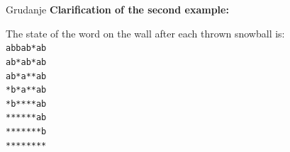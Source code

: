 \begin{statement}[
  problempoints=70,
  timelimit=2 seconds,
  memorylimit=512 MiB,
]{Grudanje}
\textbf{Clarification of the second example:}

The state of the word on the wall after each thrown snowball is:\\
 \texttt{abbab*ab} \\
 \texttt{ab*ab*ab} \\
 \texttt{ab*a**ab} \\
 \texttt{*b*a**ab} \\
 \texttt{*b****ab} \\
 \texttt{******ab} \\
 \texttt{*******b} \\
 \texttt{********}

\end{statement}

